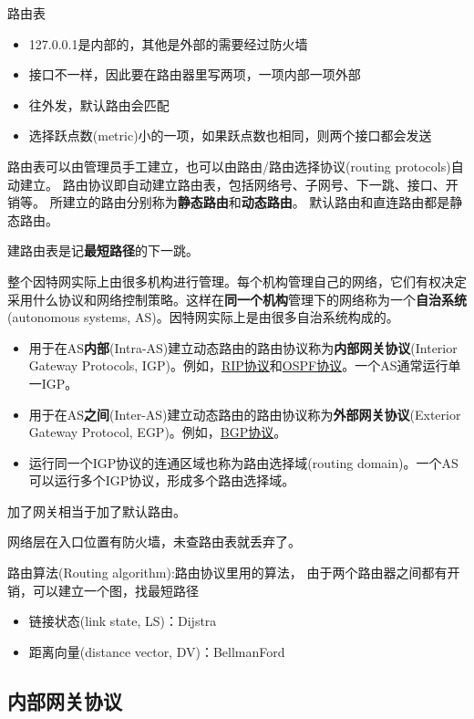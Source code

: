 路由表
\begin{itemize}
	\item 127.0.0.1是内部的，其他是外部的需要经过防火墙
	\item 接口不一样，因此要在路由器里写两项，一项内部一项外部
	\item 往外发，默认路由会匹配
	\item 选择跃点数(metric)小的一项，如果跃点数也相同，则两个接口都会发送
\end{itemize}

路由表可以由管理员手工建立，也可以由路由/路由选择协议(routing protocols)自动建立。
路由协议即自动建立路由表，包括网络号、子网号、下一跳、接口、开销等。
所建立的路由分别称为\textbf{静态路由}和\textbf{动态路由}。
默认路由和直连路由都是静态路由。

建路由表是记\textbf{最短路径}的下一跳。

整个因特网实际上由很多机构进行管理。每个机构管理自己的网络，它们有权决定采用什么协议和网络控制策略。这样在\textbf{同一个机构}管理下的网络称为一个\textbf{自治系统}(autonomous systems, AS)。因特网实际上是由很多自治系统构成的。
\begin{itemize}
	\item 用于在AS\textbf{内部}(Intra-AS)建立动态路由的路由协议称为\textbf{内部网关协议}(Interior Gateway Protocols, IGP)。例如，\underline{RIP协议}和\underline{OSPF协议}。一个AS通常运行单一IGP。
	\item 用于在AS\textbf{之间}(Inter-AS)建立动态路由的路由协议称为\textbf{外部网关协议}(Exterior Gateway Protocol, EGP)。例如，\underline{BGP协议}。
	\item 运行同一个IGP协议的连通区域也称为路由选择域(routing domain)。一个AS可以运行多个IGP协议，形成多个路由选择域。
\end{itemize}

加了网关相当于加了默认路由。

网络层在入口位置有防火墙，未查路由表就丢弃了。

路由算法(Routing algorithm):路由协议里用的算法， 由于两个路由器之间都有开销，可以建立一个图，找最短路径
\begin{itemize}
	\item 链接状态(link state, LS)：Dijstra
	\item 距离向量(distance vector, DV)：BellmanFord
\end{itemize}

\subsection{内部网关协议}
